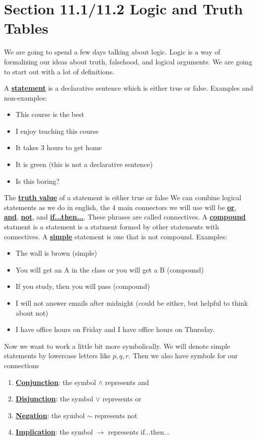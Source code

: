 \documentclass[14,fleqn]{article}
\newcommand{\defn}[1]{\textbf{\underline{#1}}}
\begin{document}
\section{Section 11.1/11.2 Logic and Truth Tables}

We are going to spend a few days talking about logic. Logic is a way of formalizing our ideas about truth, falsehood, and logical arguments. We are going to start out with a lot of definitions. 

A \defn{statement} is a declarative sentence which is either true or false. Examples and non-examples:
\begin{itemize}
	\item This course is the best
	\item I enjoy teaching this course
	\item It takes 3 hours to get home
	\item It is green (this is not a declarative sentence)
	\item Is this boring?
\end{itemize}

The \defn{truth value} of a statement is either true or false We can combine logical statements as we do in english, the 4 main connectors we will use will be \defn{or}, \defn{and}, \defn{not}, and \defn{if...then...}. These phrases are called connectives. A \defn{compound} statment is a statement is a statment formed by other statements with connectives. A \defn{simple} statement is one that is not compound. Examples:
\begin{itemize}
	\item The wall is brown (simple)
	\item You will get an A in the class or you will get a B (compound)
	\item If you study, then you will pass (compound)
	\item I will not answer emails after midnight (could be either, but helpful to think about not)
	\item I have office hours on Friday and I have office hours on Thursday.
\end{itemize}

Now we want to work a little bit more symbolically. We will denote simple statements by lowercase letters like $p,q,r.$ Then we also have symbols for our connections
\begin{enumerate}
	\item \defn{Conjunction}: the symbol $\wedge$ represents and
	\item \defn{Disjunction}: the symbol $\vee$ represents or
	\item \defn{Negation}: the symbol $\sim$ represents not
	\item \defn{Implication}: the symbol $\to$ represents if...then...
\end{enumerate}
\end{document}
